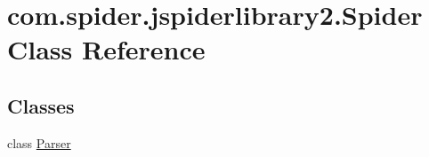 \hypertarget{classcom_1_1spider_1_1jspiderlibrary2_1_1_spider}{\section{com.\-spider.\-jspiderlibrary2.\-Spider \-Class \-Reference}
\label{classcom_1_1spider_1_1jspiderlibrary2_1_1_spider}
}
\subsection*{\-Classes}
\begin{DoxyCompactItemize}
\item 
class \hyperlink{classcom_1_1spider_1_1jspiderlibrary2_1_1_spider_1_1_parser}{\-Parser}
\end{DoxyCompactItemize}
